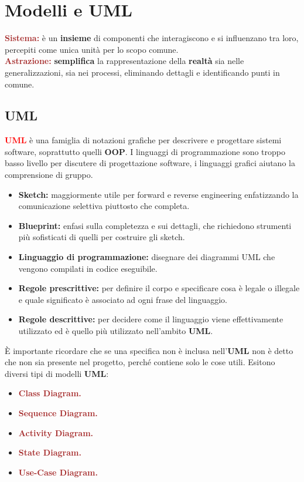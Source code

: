 \chapter{Modelli e UML}
\begin{boxDef}
\textbf{\textcolor{brown}{Sistema:}} è un \textbf{insieme} di componenti che interagiscono e si influenzano tra loro, percepiti come unica unità per lo scopo comune. \\
\textbf{\textcolor{brown}{Astrazione:}} \textbf{semplifica} la rappresentazione della \textbf{realtà} sia nelle generalizzazioni, sia nei processi, eliminando dettagli e identificando punti in comune.
\end{boxDef}

\section{UML}
\begin{boxDef}
\textbf{\textcolor{red}{UML}} è una famiglia di notazioni grafiche per descrivere e progettare sistemi software, soprattutto quelli \textbf{OOP}. I linguaggi di programmazione sono troppo basso livello per discutere di progettazione software, i linguaggi grafici aiutano la comprensione di gruppo.
\begin{itemize}
    \item \textbf{Sketch:} maggiormente utile per forward e reverse engineering enfatizzando la comunicazione selettiva piuttosto che completa.
    \item \textbf{Blueprint:} enfasi sulla completezza e sui dettagli, che richiedono strumenti più sofisticati di quelli per costruire gli sketch.
    \item \textbf{Linguaggio di programmazione:} disegnare dei diagrammi UML che vengono compilati in codice eseguibile.
\end{itemize}
\end{boxDef}
\begin{itemize}
    \item \textbf{Regole prescrittive:} per definire il corpo e specificare cosa è legale o illegale e quale significato è associato ad ogni frase del linguaggio.
    \item \textbf{Regole descrittive:} per decidere come il linguaggio viene effettivamente utilizzato ed è quello più utilizzato nell'ambito \textbf{UML}.
\end{itemize}
È importante ricordare che se una specifica non è inclusa nell'\textbf{UML} non è detto che non sia presente nel progetto, perché contiene solo le cose utili. Esitono diversi tipi di modelli \textbf{UML}:
\begin{itemize}
    \item \textbf{\textcolor{brown}{Class Diagram.}}
    \item \textbf{\textcolor{brown}{Sequence Diagram.}}
    \item \textbf{\textcolor{brown}{Activity Diagram.}}
    \item \textbf{\textcolor{brown}{State Diagram.}}
    \item \textbf{\textcolor{brown}{Use-Case Diagram.}}
\end{itemize}

